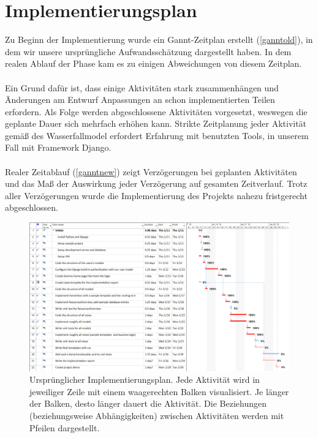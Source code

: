 \documentclass[parskip=full,11pt]{scrartcl}
\begin{document}
\section{Implementierungsplan}
Zu Beginn der Implementierung wurde ein Gannt-Zeitplan erstellt (\autoref{ganntold}), in dem wir unsere ursprüngliche  Aufwandsschätzung dargestellt haben. In dem realen Ablauf der Phase kam es zu einigen Abweichungen von diesem Zeitplan.\\\\
Ein Grund dafür ist, dass einige Aktivitäten stark zusammenhängen und Änderungen am Entwurf Anpassungen an schon implementierten Teilen erfordern. Als Folge werden abgeschlossene Aktivitäten vorgesetzt, weswegen die geplante Dauer sich mehrfach erhöhen kann. Strikte Zeitplanung jeder Aktivität gemäß des Wasserfallmodel erfordert Erfahrung mit benutzten Tools, in unserem Fall mit Framework Django.\\\\ 
Realer Zeitablauf (\autoref{ganntnew}) zeigt Verzögerungen bei geplanten Aktivitäten und das Maß der Auswirkung jeder Verzögerung auf gesamten Zeitverlauf. Trotz aller Verzögerungen wurde die Implementierung des Projekts nahezu fristgerecht abgeschlossen.\\


 \begin{figure}[ht!]
 	\centering
 	\includegraphics[width=1\textwidth]{res/gannt_plan.png}
 	\caption{Ursprünglicher Implementierungsplan. Jede Aktivität wird in jeweiliger Zeile mit einem waagerechten Balken visualisiert. Je länger der Balken, desto länger dauert die Aktivität. Die Beziehungen (beziehungsweise Abhängigkeiten) zwischen Aktivitäten werden mit Pfeilen dargestellt.}
 	\label{ganntold}
 \end{figure}
 
\end{document}
